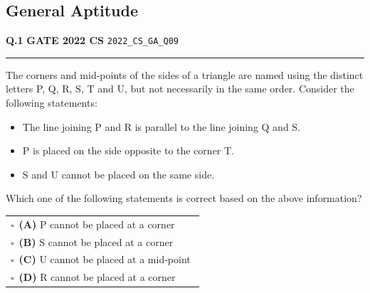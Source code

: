 \documentclass[a4paper,10pt]{article}
\begin{document}
\newpage

\vspace{8pt}
\subsection*{General Aptitude}
\vspace{-4pt}
\noindent
\begin{tcolorbox}[
    blanker,
    sidebyside,
    sidebyside align=top,
    lefthand width=0.55\textwidth,
    top=4pt, bottom=4pt, left=0pt, right=0pt,
    middle=16pt,
    underlay={
        \draw[dashed, black!80, line width=0.8pt, dash pattern=on 4pt off 3pt]
            ([xshift=0.55\textwidth+8pt]frame.north west) --
            ([xshift=0.55\textwidth+8pt]frame.south west);
    }
]
\textbf{Q.1}  \hfill {\footnotesize\textbf{GATE 2022 CS} \quad \tiny\texttt{2022\_CS\_GA\_Q09}}
\vspace{2pt}\hrule height 0.3pt\vspace{4pt}

The corners and mid-points of the sides of a triangle are named using the distinct letters P, Q, R, S, T and U, but not necessarily in the same order. Consider the following statements:
\begin{itemize}[itemsep=0pt,topsep=2pt]
\item The line joining P and R is parallel to the line joining Q and S.
\item P is placed on the side opposite to the corner T.
\item S and U cannot be placed on the same side.
\end{itemize}
Which one of the following statements is correct based on the above information?

\par\vspace{6pt}\noindent
\begin{tabular}{@{}p{0.98\linewidth}@{}}
$\square$\ \textbf{(A)} P cannot be placed at a corner \\
\addlinespace[3pt]
$\square$\ \textbf{(B)} S cannot be placed at a corner \\
\addlinespace[3pt]
$\square$\ \textbf{(C)} U cannot be placed at a mid-point \\
\addlinespace[3pt]
$\square$\ \textbf{(D)} R cannot be placed at a corner
\end{tabular}


\end{tcolorbox}
\end{document}
